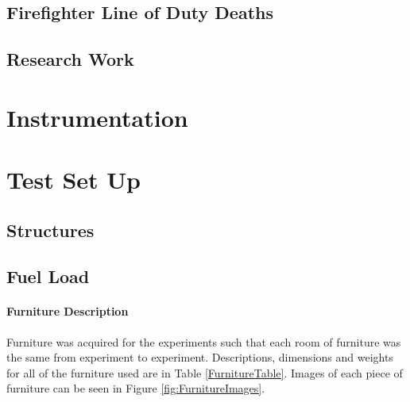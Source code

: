 \documentclass{article}
\begin{document}
\subsection{Firefighter Line of Duty Deaths}
\subsection{Research Work}

\section{Instrumentation}

\section{Test Set Up}
\subsection{Structures}
\subsection{Fuel Load}
\paragraph{Furniture Description} \mbox{}

Furniture was acquired for the experiments such that each room of furniture was the same from experiment to experiment. Descriptions, dimensions and weights for all of the furniture used are in Table \ref{FurnitureTable}. Images of each piece of furniture can be seen in Figure \ref{fig:FurnitureImages}.
\end{document}
